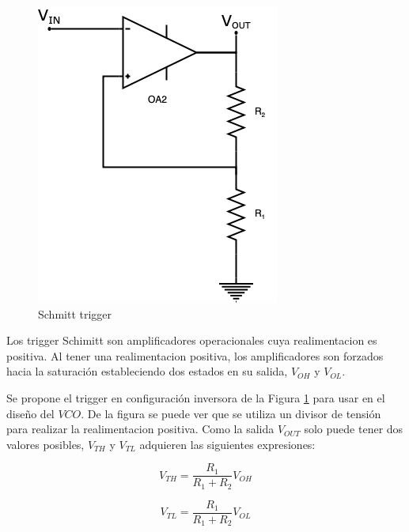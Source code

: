 \begin{figure}
    \begin{center}
        \includegraphics[scale = 0.5]{../Ex3/Resources/trigger.png}    
        \caption{Schmitt trigger}  
        \label{fig:ej3_trigger}
    \end{center}
      
    \end{figure}

   

 Los trigger Schimitt son amplificadores operacionales cuya realimentacion es positiva. Al tener una realimentacion positiva, los amplificadores son forzados hacia la saturación estableciendo dos estados en su salida, $V_{OH}$ y $V_{OL}$. 



  

Se propone el trigger en configuración inversora de la Figura \ref{fig:ej3_trigger} para usar en el diseño del $VCO$. De la figura se puede ver que se utiliza un divisor de tensión para realizar la realimentacion positiva. Como la salida $V_{OUT}$ solo puede tener dos valores posibles, $V_{TH}$ y $V_{TL}$ adquieren las siguientes expresiones:

\begin{equation}
    V_{TH} = \frac{R_1}{R_1 + R_2} V_{OH}
    \label{eq:vth}
\end{equation}

\begin{equation}
    V_{TL} = \frac{R_1}{R_1 + R_2} V_{OL}
    \label{eq:vtl}
\end{equation}

